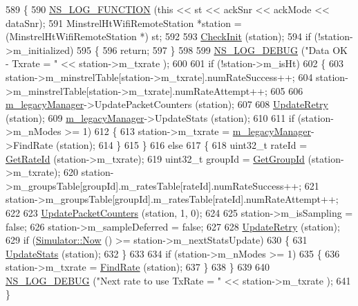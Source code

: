 \begin{DoxyCode}
589 \{
590   \hyperlink{log-macros-disabled_8h_a90b90d5bad1f39cb1b64923ea94c0761}{NS\_LOG\_FUNCTION} (\textcolor{keyword}{this} << st << ackSnr << ackMode << dataSnr);
591   MinstrelHtWifiRemoteStation *station = (MinstrelHtWifiRemoteStation *) st;
592 
593   \hyperlink{classns3_1_1MinstrelHtWifiManager_a7f94804a34efa6121bdfd5d01ac34694}{CheckInit} (station);
594   \textcolor{keywordflow}{if} (!station->m\_initialized)
595     \{
596       \textcolor{keywordflow}{return};
597     \}
598 
599   \hyperlink{group__logging_ga413f1886406d49f59a6a0a89b77b4d0a}{NS\_LOG\_DEBUG} (\textcolor{stringliteral}{"Data OK - Txrate = "} << station->m\_txrate  );
600 
601   \textcolor{keywordflow}{if} (!station->m\_isHt)
602     \{
603       station->m\_minstrelTable[station->m\_txrate].numRateSuccess++;
604       station->m\_minstrelTable[station->m\_txrate].numRateAttempt++;
605 
606       \hyperlink{classns3_1_1MinstrelHtWifiManager_ae10ffd948e46a60593b1aef80372082a}{m\_legacyManager}->UpdatePacketCounters (station);
607 
608       \hyperlink{classns3_1_1MinstrelHtWifiManager_a861e370c15601dd71c5bf79cd048b4e4}{UpdateRetry} (station);
609       \hyperlink{classns3_1_1MinstrelHtWifiManager_ae10ffd948e46a60593b1aef80372082a}{m\_legacyManager}->UpdateStats (station);
610 
611       \textcolor{keywordflow}{if} (station->m\_nModes >= 1)
612         \{
613           station->m\_txrate = \hyperlink{classns3_1_1MinstrelHtWifiManager_ae10ffd948e46a60593b1aef80372082a}{m\_legacyManager}->FindRate (station);
614         \}
615     \}
616   \textcolor{keywordflow}{else}
617     \{
618       uint32\_t rateId = \hyperlink{classns3_1_1MinstrelHtWifiManager_a6162341f1348bbe713d09642b09ac658}{GetRateId} (station->m\_txrate);
619       uint32\_t groupId = \hyperlink{classns3_1_1MinstrelHtWifiManager_a43157e6007b4b922043cb02a99ea6d1f}{GetGroupId} (station->m\_txrate);
620       station->m\_groupsTable[groupId].m\_ratesTable[rateId].numRateSuccess++;
621       station->m\_groupsTable[groupId].m\_ratesTable[rateId].numRateAttempt++;
622 
623       \hyperlink{classns3_1_1MinstrelHtWifiManager_a7a73ce35e212586453fb9405c55654a5}{UpdatePacketCounters} (station, 1, 0);
624 
625       station->m\_isSampling = \textcolor{keyword}{false};
626       station->m\_sampleDeferred = \textcolor{keyword}{false};
627 
628       \hyperlink{classns3_1_1MinstrelHtWifiManager_a861e370c15601dd71c5bf79cd048b4e4}{UpdateRetry} (station);
629       \textcolor{keywordflow}{if} (\hyperlink{classns3_1_1Simulator_ac3178fa975b419f7875e7105be122800}{Simulator::Now} () >=  station->m\_nextStatsUpdate)
630         \{
631           \hyperlink{classns3_1_1MinstrelHtWifiManager_add9ba12485354ddfaae5a68a90469a92}{UpdateStats} (station);
632         \}
633 
634       \textcolor{keywordflow}{if} (station->m\_nModes >= 1)
635         \{
636           station->m\_txrate = \hyperlink{classns3_1_1MinstrelHtWifiManager_a06c5d6ae62e898a226ffd6cb0b448038}{FindRate} (station);
637         \}
638     \}
639 
640   \hyperlink{group__logging_ga413f1886406d49f59a6a0a89b77b4d0a}{NS\_LOG\_DEBUG} (\textcolor{stringliteral}{"Next rate to use TxRate = "} << station->m\_txrate  );
641 \}
\end{DoxyCode}


